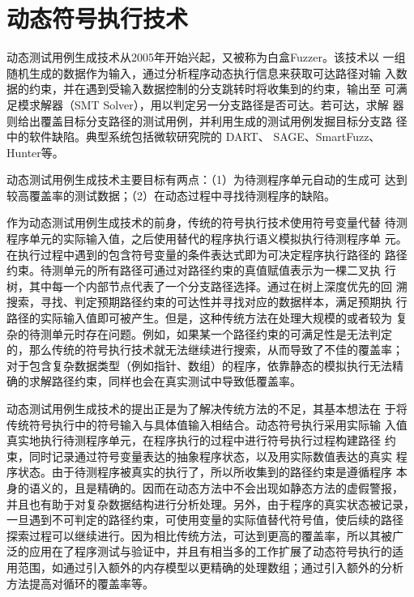 \section{动态符号执行技术}
动态测试用例生成技术从2005年开始兴起，又被称为白盒Fuzzer。该技术以
一组随机生成的数据作为输入，通过分析程序动态执行信息来获取可达路径对输
入数据的约束，并在遇到受输入数据控制的分支跳转时将收集到的约束，输出至
可满足模求解器（SMT Solver），用以判定另一分支路径是否可达。若可达，求解
器则给出覆盖目标分支路径的测试用例，并利用生成的测试用例发掘目标分支路
径中的软件缺陷。典型系统包括微软研究院的 DART、 SAGE、SmartFuzz、 Hunter等。

动态测试用例生成技术主要目标有两点：（1）为待测程序单元自动的生成可
达到较高覆盖率的测试数据；（2）在动态过程中寻找待测程序的缺陷。

作为动态测试用例生成技术的前身，传统的符号执行技术使用符号变量代替
待测程序单元的实际输入值，之后使用替代的程序执行语义模拟执行待测程序单
元。在执行过程中遇到的包含符号变量的条件表达式即为可决定程序执行路径的
路径约束。待测单元的所有路径可通过对路径约束的真值赋值表示为一棵二叉执
行树，其中每一个内部节点代表了一个分支路径选择。通过在树上深度优先的回
溯搜索，寻找、判定预期路径约束的可达性并寻找对应的数据样本，满足预期执
行路径的实际输入值即可被产生。但是，这种传统方法在处理大规模的或者较为
复杂的待测单元时存在问题。例如，如果某一个路径约束的可满足性是无法判定
的，那么传统的符号执行技术就无法继续进行搜索，从而导致了不佳的覆盖率；
对于包含复杂数据类型（例如指针、数组）的程序，依靠静态的模拟执行无法精
确的求解路径约束，同样也会在真实测试中导致低覆盖率。

动态测试用例生成技术的提出正是为了解决传统方法的不足，其基本想法在
于将传统符号执行中的符号输入与具体值输入相结合。动态符号执行采用实际输
入值真实地执行待测程序单元，在程序执行的过程中进行符号执行过程构建路径
约束，同时记录通过符号变量表达的抽象程序状态，以及用实际数值表达的真实
程序状态。由于待测程序被真实的执行了，所以所收集到的路径约束是遵循程序
本身的语义的，且是精确的。因而在动态方法中不会出现如静态方法的虚假警报，
并且也有助于对复杂数据结构进行分析处理。另外，由于程序的真实状态被记录，
一旦遇到不可判定的路径约束，可使用变量的实际值替代符号值，使后续的路径
探索过程可以继续进行。因为相比传统方法，可达到更高的覆盖率，所以其被广
泛的应用在了程序测试与验证中，并且有相当多的工作扩展了动态符号执行的适
用范围，如通过引入额外的内存模型以更精确的处理数组；通过引入额外的分析
方法提高对循环的覆盖率等。

